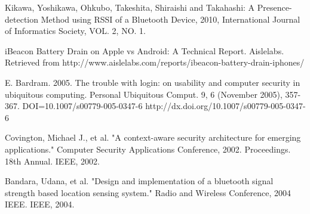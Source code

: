 
%
%
%
\begin{thebibliography}{1}

 Kikawa, Yoshikawa, Ohkubo, Takeshita, Shiraishi and Takahashi:  
 A Presence-detection Method using RSSI of a Bluetooth Device, 2010, International Journal of Informatics Society, VOL. 2, NO. 1. 


iBeacon Battery Drain on Apple vs Android: A Technical Report. Aislelabs. Retrieved from http://www.aislelabs.com/reports/ibeacon-battery-drain-iphones/

E. Bardram. 2005. The trouble with login: on usability and computer security in ubiquitous computing. Personal Ubiquitous Comput. 9, 6 (November 2005), 357-367. DOI=10.1007/s00779-005-0347-6 http://dx.doi.org/10.1007/s00779-005-0347-6

Covington, Michael J., et al. "A context-aware security architecture for emerging applications." Computer Security Applications Conference, 2002. Proceedings. 18th Annual. IEEE, 2002.

Bandara, Udana, et al. "Design and implementation of a bluetooth signal strength based location sensing system." Radio and Wireless Conference, 2004 IEEE. IEEE, 2004.


\end{thebibliography}
